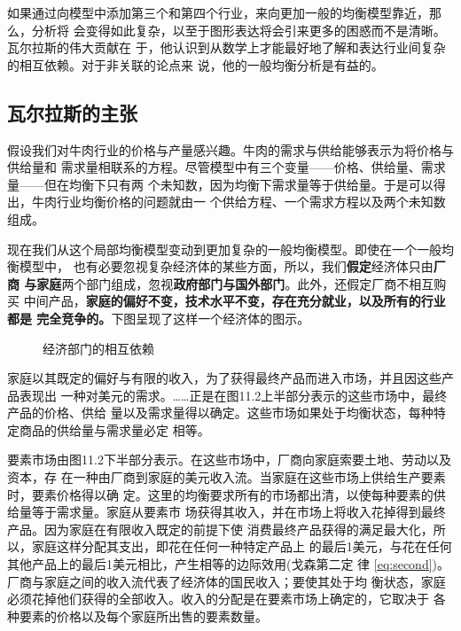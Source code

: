 如果通过向模型中添加第三个和第四个行业，来向更加一般的均衡模型靠近，那么，分析将
会变得如此复杂，以至于图形表达将会引来更多的困惑而不是清晰。瓦尔拉斯的伟大贡献在
于，他认识到从数学上才能最好地了解和表达行业间复杂的相互依赖。对于非关联的论点来
说，他的一般均衡分析是有益的。

\subsection{瓦尔拉斯的主张}

假设我们对牛肉行业的价格与产量感兴趣。牛肉的需求与供给能够表示为将价格与供给量和
需求量相联系的方程。尽管模型中有三个变量——价格、供给量、需求量——但在均衡下只有两
个未知数，因为均衡下需求量等于供给量。于是可以得出，牛肉行业均衡价格的问题就由一
个供给方程、一个需求方程以及两个未知数组成。

现在我们从这个局部均衡模型变动到更加复杂的一般均衡模型。即使在一个一般均衡模型中，
也有必要忽视复杂经济体的某些方面，所以，我们\textbf{假定}经济体只由\textbf{厂商
与家庭}两个部门组成，忽视\textbf{政府部门与国外部门}。此外，还假定厂商不相互购买
中间产品，\textbf{家庭的偏好不变，技术水平不变，存在充分就业，以及所有的行业都是
完全竞争的。}下图呈现了这样一个经济体的图示。
\begin{figure}[ht] \centering
  \caption{\label{fig:interdepend}经济部门的相互依赖}
\end{figure}

家庭以其既定的偏好与有限的收入，为了获得最终产品而进入市场，并且因这些产品表现出
一种对美元的需求。……正是在图11.2上半部分表示的这些市场中，最终产品的价格、供给
量以及需求量得以确定。这些市场如果处于均衡状态，每种特定商品的供给量与需求量必定
相等。

要素市场由图11.2下半部分表示。在这些市场中，厂商向家庭索要土地、劳动以及资本，存
在一种由厂商到家庭的美元收入流。当家庭在这些市场上供给生产要素时，要素价格得以确
定。这里的均衡要求所有的市场都出清，以使每种要素的供给量等于需求量。家庭从要素市
场获得其收入，并在市场上将收入花掉得到最终产品。因为家庭在有限收入既定的前提下使
消费最终产品获得的满足最大化，所以，家庭这样分配其支出，即花在任何一种特定产品上
的最后1美元，与花在任何其他产品上的最后1美元相比，产生相等的边际效用(戈森第二定
律 \cref{eq:second})。厂商与家庭之间的收入流代表了经济体的国民收入；要使其处于均
衡状态，家庭必须花掉他们获得的全部收入。收入的分配是在要素市场上确定的，它取决于
各种要素的价格以及每个家庭所出售的要素数量。

